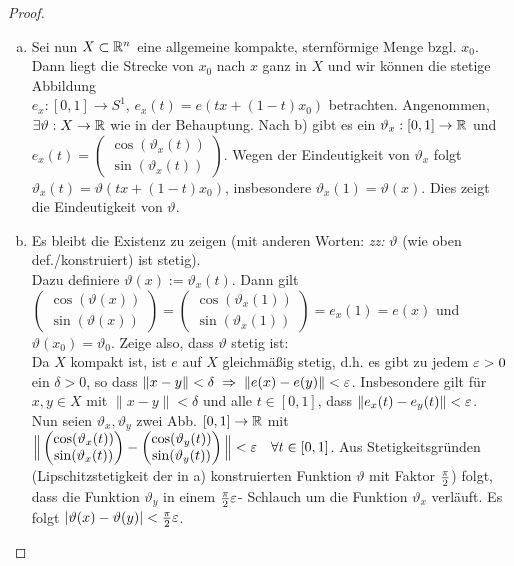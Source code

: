 \documentclass[11pt]{scrbook}
\newcommand{\tta}{\vartheta}
\begin{document}
\begin{lem}[Hochhebungslemma]
\begin{proof}
\begin{enumerate}[a)]
	\item 
Sei nun $X \subset \mathbb{R}^n$ eine allgemeine kompakte, sternförmige Menge bzgl. $x_0$. \\  Dann liegt die Strecke von $x_0$ nach $x$ ganz in $X$ und wir können die stetige Abbildung \\ $e_x: [0,1] \to S^1$,  $ e_x(t) = e(tx + (1-t) x_0)$ betrachten. Angenommen, $\exists \tta: X \to \R$ wie in der Behauptung. Nach b) gibt es ein $\tta_x: [0,1] \to \R$ und $e_x(t) = \begin{pmatrix} \cos(\tta_x(t)) \\ \sin(\tta_x(t)) \end{pmatrix}$. Wegen der Eindeutigkeit von $\tta_x$ folgt  $\tta_x(t) = \tta(tx + (1-t) x_0)$, insbesondere $\tta_x(1) = \tta(x)$. Dies zeigt die Eindeutigkeit von $\tta$.

	\item 
Es bleibt die Existenz zu zeigen (mit anderen Worten: \emph{zz:} $\tta$ (wie oben def./konstruiert) ist stetig). \\
Dazu definiere $\tta(x) := \tta_x(t)$. Dann gilt $\begin{pmatrix} \cos(\tta(x)) \\ \sin(\tta(x)) \end{pmatrix} = \begin{pmatrix} \cos(\tta_x(1)) \\ \sin(\tta_x(1)) \end{pmatrix} = e_x(1) = e(x)$ und $\tta(x_0) = \tta_0$. Zeige also, dass $\tta$ stetig ist: \\
Da $X$ kompakt ist, ist $e$ auf $X$ gleichmäßig stetig, d.h. es gibt zu jedem $\varepsilon > 0$ ein $\delta > 0$, so dass $\| x - y \| < \delta \; \Rightarrow \; \| e(x) - e(y) \| < \varepsilon$. Insbesondere gilt für $x,y \in X$ mit $\| x - y \| < \delta$ und alle $t \in [0,1]$, dass $\| e_x(t) - e_y(t) \| < \varepsilon$. \\
Nun seien $\tta_x,  \tta_y$ zwei Abb. $[0,1] \to \mathbb{R}$ mit $\Big \| \begin{pmatrix} \cos(\tta_x(t)) \\ \sin(\tta_x(t)) \end{pmatrix} - \begin{pmatrix} \cos(\tta_y(t)) \\ \sin(\tta_y(t)) \end{pmatrix} \Big \| < \eps \quad \forall t \in [0,1]$. Aus Stetigkeitsgründen (Lipschitzstetigkeit der in a) konstruierten Funktion $\tta$ mit Faktor $\frac{\pi}{2}$) folgt, dass die Funktion $\tta_y$ in einem $\frac{\pi}{2} \varepsilon$- \glqq Schlauch \grqq um die Funktion $\tta_x$ verläuft. Es folgt $|\tta(x) - \tta(y)| < \f{\pi}{2} \eps$.
\end{enumerate}
\end{proof}
\end{lem}
\end{document}
